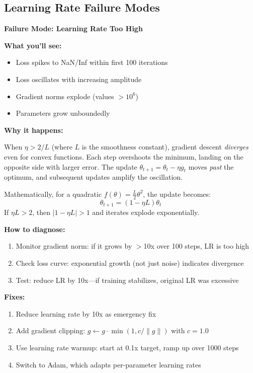 \documentclass[../../main.tex]{subfiles}
\begin{document}
\subsection{Learning Rate Failure Modes}

\begin{whatbreaks}
\textbf{Failure Mode: Learning Rate Too High}

\textbf{What you'll see:}
\begin{itemize}
    \item Loss spikes to NaN/Inf within first 100 iterations
    \item Loss oscillates with increasing amplitude
    \item Gradient norms explode (values $> 10^6$)
    \item Parameters grow unboundedly
\end{itemize}

\textbf{Why it happens:}

When $\eta > 2/L$ (where $L$ is the smoothness constant), gradient descent \textit{diverges} even for convex functions. Each step overshoots the minimum, landing on the opposite side with larger error. The update $\theta_{t+1} = \theta_t - \eta g_t$ moves \textit{past} the optimum, and subsequent updates amplify the oscillation.

Mathematically, for a quadratic $f(\theta) = \frac{L}{2}\theta^2$, the update becomes:
\[
    \theta_{t+1} = (1 - \eta L)\theta_t
\]
If $\eta L > 2$, then $|1 - \eta L| > 1$ and iterates explode exponentially.

\textbf{How to diagnose:}
\begin{enumerate}
    \item Monitor gradient norm: if it grows by $>$10x over 100 steps, LR is too high
    \item Check loss curve: exponential growth (not just noise) indicates divergence
    \item Test: reduce LR by 10x---if training stabilizes, original LR was excessive
\end{enumerate}

\textbf{Fixes:}
\begin{enumerate}
    \item Reduce learning rate by 10x as emergency fix
    \item Add gradient clipping: $g \leftarrow g \cdot \min(1, c/\|g\|)$ with $c = 1.0$
    \item Use learning rate warmup: start at 0.1x target, ramp up over 1000 steps
    \item Switch to Adam, which adapts per-parameter learning rates
\end{enumerate}
\end{whatbreaks}
\end{document}
